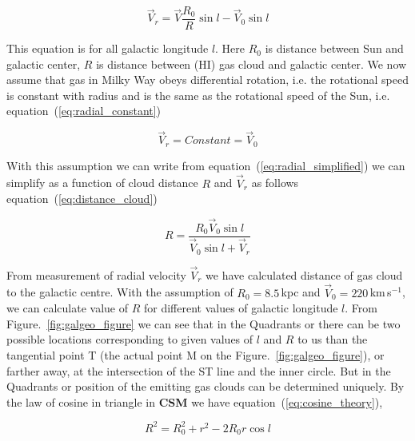 \documentclass[conference]{IEEEtran}
\begin{document}
\begin{equation}
 \vec{V}_{r}=\vec{V}\frac{\mathit{R}_{0}}{\mathit{R}}\sin l-\vec{V}_{0}\sin l
 \label{eq:radial_simplified}
\end{equation} 

This equation is for all galactic longitude $\mathit{l}$. Here $\mathit{R}_{0}$ is distance between Sun and galactic center, $\mathit{R}$ is distance between (HI) gas cloud and galactic center. We now assume that gas in Milky Way obeys differential rotation, i.e. the rotational speed is constant with radius and is the same as the rotational speed of the Sun, i.e. equation~(\ref{eq:radial_constant})

\begin{equation}
 \vec{V}_{r}=Constant=\vec{V}_{0}
 \label{eq:radial_constant}
\end{equation}

With this assumption we can write from equation~(\ref{eq:radial_simplified}) we can simplify as a function of cloud distance $\mathit{R}$ and $\vec{V}_{r}$  as follows equation~(\ref{eq:distance_cloud})

\begin{equation}
 \mathit{R}=\frac{\mathit{R}_{0}\vec{V}_{0}\sin l}{\vec{V}_{0}\sin l+\vec{V}_{r}}
 \label{eq:distance_cloud}
\end{equation}

From measurement of radial velocity $\vec{V}_{r}$ we have calculated distance of gas cloud to the galactic centre. With the assumption of $\mathit{R}_{0}=8.5$\,kpc and $\vec{V}_{0}=220$\,km\,s$^{-1}$, we can calculate value of $\mathit{R}$ for different values of galactic longitude $\mathit{l}$. From Figure.~\ref{fig:galgeo_figure} we can see that in the Quadrants  or  there can be two possible locations corresponding to given values of $\mathit{l}$ and $\mathit{R}$ to us than the tangential point T (the actual point M on the Figure.~\ref{fig:galgeo_figure}), or farther away, at the intersection of the ST line and the inner circle. But in the Quadrants  or  position of the emitting gas clouds can be determined uniquely\cite{CathyHorellou2015}. By the law of cosine in triangle in \textbf{CSM} we have equation~(\ref{eq:cosine_theory}),

\begin{equation}
 \mathit{R}^{2}=\mathit{R}_{0}^{2}+\mathit{r}^{2}-2\mathit{R}_{0}\mathit{r}\cos l
 \label{eq:cosine_theory}
\end{equation}
\end{document}
